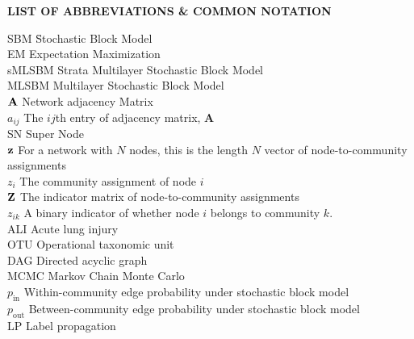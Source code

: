 {}

\begin{center}
{\Large \textbf{LIST OF ABBREVIATIONS \& COMMON NOTATION}}
\end{center}

\newcommand{\Ab}[2]{\noindent  #1 \> #2 \\}
\newcommand{\Abi}[2]{\noindent #1 \hspace{1.5cm} \= #2 \\}

\begin{tabbing}
\Abi{SBM}{Stochastic Block Model}
\Ab{EM}{Expectation Maximization}
\Ab{sMLSBM}{Strata Multilayer Stochastic Block Model}
\Ab{MLSBM}{Multilayer Stochastic Block Model}
\Ab{${\bf A}$}{Network adjacency Matrix}
\Ab{$a_{ij}$}{The $ij$th entry of adjacency matrix, {\bf A}}
\Ab{SN}{Super Node}
\Ab{${\bf z}$}{For a network with $N$ nodes, this is the length $N$ vector of node-to-community assignments}
\Ab{$z_{i}$}{The community assignment of node $i$}
\Ab{${\bf Z}$}{The indicator matrix of node-to-community assignments}
\Ab{$z_{ik}$}{A binary indicator of whether node $i$ belongs to community $k$.}
\Ab{ALI}{Acute lung injury}
\Ab{OTU}{Operational taxonomic unit}
\Ab{DAG}{Directed acyclic graph}
\Ab{MCMC}{Markov Chain Monte Carlo}
\Ab{$p_{\text{in}}$}{Within-community edge probability under stochastic block model}
\Ab{$p_{\text{out}}$}{Between-community edge probability under stochastic block model}
\Ab{LP}{Label propagation}

\end{tabbing}

\clearpage
